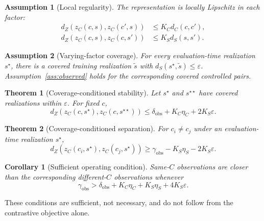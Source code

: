 \documentclass[11pt]{article}
\newtheorem{theorem}{Theorem}
\newtheorem{corollary}{Corollary}
\newtheorem{assumption}{Assumption}
\newcommand{\zC}{z_C}
\newcommand{\dC}{d_C}
\newcommand{\dS}{d_S}
\newcommand{\dZ}{d_Z}
\begin{document}
\begin{assumption}[Local regularity]\label{ass:lipschitz}
The representation is locally Lipschitz in each factor:
\begin{align}
\dZ(\zC(c,s),\zC(c',s))&\leq K_C\dC(c,c'),\\
\dZ(\zC(c,s),\zC(c,s'))&\leq K_S\dS(s,s').
\end{align}
\end{assumption}

\begin{assumption}[Varying-factor coverage]\label{ass:coverage}
For every evaluation-time realization $s^\star$, there is a covered training realization $\tilde s$ with $\dS(s^\star,\tilde s)\leq\varepsilon$. Assumption~\ref{ass:observed} holds for the corresponding covered controlled pairs.
\end{assumption}

\begin{theorem}[Coverage-conditioned stability]\label{thm:stability}
Let $s^\star$ and $s^{\star\star}$ have covered realizations within $\varepsilon$. For fixed $c$,
\begin{equation}
\dZ(\zC(c,s^\star),\zC(c,s^{\star\star}))
\leq\delta_{\mathrm{obs}}+K_C\eta_C+2K_S\varepsilon.
\end{equation}
\end{theorem}

\begin{theorem}[Coverage-conditioned separation]\label{thm:separation}
For $c_i\ne c_j$ under an evaluation-time realization $s^\star$,
\begin{equation}
\dZ(\zC(c_i,s^\star),\zC(c_j,s^\star))
\geq\gamma_{\mathrm{obs}}-K_S\eta_S-2K_S\varepsilon.
\end{equation}
\end{theorem}

\begin{corollary}[Sufficient operating condition]\label{cor:condition}
Same-$C$ observations are closer than the corresponding different-$C$ observations whenever
\begin{equation}
\gamma_{\mathrm{obs}}>
\delta_{\mathrm{obs}}+K_C\eta_C+K_S\eta_S+4K_S\varepsilon.
\end{equation}
\end{corollary}
These conditions are sufficient, not necessary, and do not follow from the contrastive objective alone.
\end{document}
